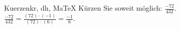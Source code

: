 \begin{MAufgabe}{Kuerzen}{kr, dh, MaTeX}
K\"urzen Sie soweit m\"oglich: $\frac{-72}{432}$.\\ 
\ifLsg\MLoesung
\quad $\frac{-72}{432}=\frac{(72)\cdot(-1)}{(72)\cdot(6)}=\frac{-1}{6}$.\else\relax\fi
 \end{MAufgabe}